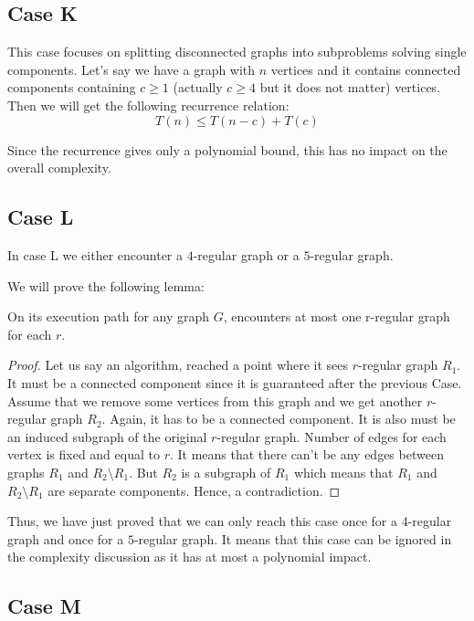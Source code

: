 \subsection{Case K}
This case focuses on splitting disconnected graphs into subproblems solving single components. Let's say we have a graph with $n$ vertices and it contains connected components containing $c\geq 1$ (actually $c\geq 4$ but it does not matter) vertices. Then we will get the following recurrence relation:
$$
T(n) \leq T(n-c) + T(c)
$$

Since the recurrence gives only a polynomial bound, this has no impact on the overall complexity.

\subsection{Case L}

In case L we either encounter a $4$-regular graph or a $5$-regular graph. 

We will prove the following lemma:
\begin{lemma}
On its execution path for any graph $G$,  encounters at most one r-regular graph for each $r$.
\end{lemma}

\begin{proof}
Let us say an algorithm, reached a point where it sees $r$-regular graph $R_1$. It must be a connected component since it is guaranteed after the previous Case. Assume that we remove some vertices from this graph and we get another $r$-regular graph $R_2$. Again, it has to be a connected component. It is also must be an induced subgraph of the original $r$-regular graph. Number of edges for each vertex is fixed and equal to $r$. It means that there can't be any edges between graphs $R_1$ and $R_2 \setminus R_1$. But $R_2$ is a subgraph of $R_1$ which means that $R_1$ and $R_2 \setminus R_1$ are separate components. Hence, a contradiction.
\end{proof}

Thus, we have just proved that we can only reach this case once for a $4$-regular graph and once for a $5$-regular graph. It means that this case can be ignored in the complexity discussion as it has at most a polynomial impact.

\subsection{Case M}

